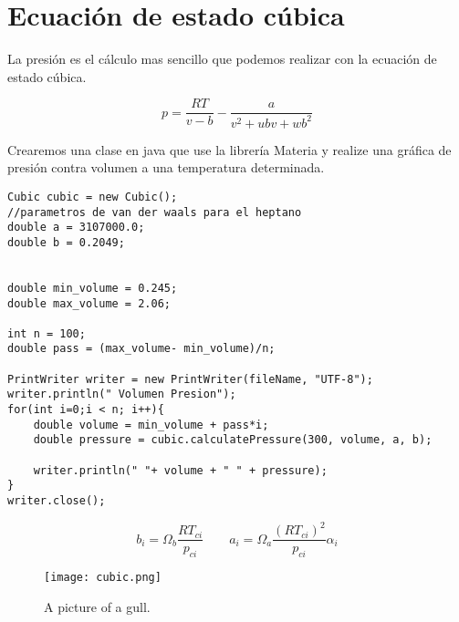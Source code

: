 \section{Ecuación de estado cúbica}
 La presión es el cálculo mas sencillo que podemos realizar con la ecuación de estado cúbica.

\begin{equation}
	p = \frac{R T}{v-b} - \frac{a}{v^2 +u b v + w b^2 }
\end{equation}

 Crearemos una clase en java que use la librería Materia y realize una gráfica de presión contra volumen a una temperatura determinada.






\begin{lstlisting}[label=se,caption=Some Code]
Cubic cubic = new Cubic();
//parametros de van der waals para el heptano
double a = 3107000.0;
double b = 0.2049;


double min_volume = 0.245;
double max_volume = 2.06;

int n = 100;
double pass = (max_volume- min_volume)/n;

PrintWriter writer = new PrintWriter(fileName, "UTF-8");
writer.println(" Volumen Presion");
for(int i=0;i < n; i++){
	double volume = min_volume + pass*i;
	double pressure = cubic.calculatePressure(300, volume, a, b);
	
	writer.println(" "+ volume + " " + pressure);
}
writer.close();		
\end{lstlisting}


\begin{equation}
	b_i = \Omega_b \frac{R T_{ci}}{p_{ci}} \qquad a_i = \Omega_a \frac{\left(R T_{ci}\right)^2}{p_{ci}} \alpha_i
\end{equation}






\begin{figure}[!h]
  
  \centering
    \texttt{[image: cubic.png]}
    \caption{A picture of a gull.}
\end{figure}








